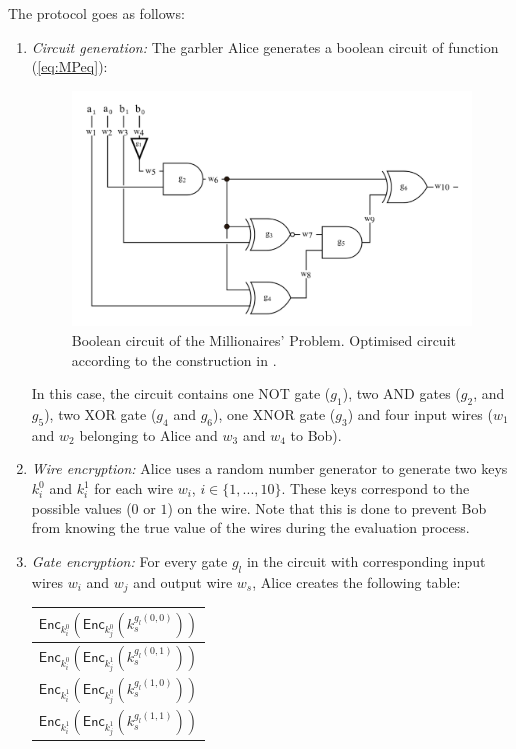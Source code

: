 The protocol goes as follows:
\begin{enumerate}
    \item \textit{Circuit generation:} The garbler Alice generates a boolean circuit of function (\ref{eq:MPeq}):
    
    \begin{figure}[h]
        \centering
        \includegraphics[scale=0.3]{Chapter_TechnicalOverview/booleanCircuit.png}

        \caption{Boolean circuit of the Millionaires' Problem. Optimised circuit according to the construction in \cite{Kolesnikov2009}.}
        \label{fig:boolean}
    \end{figure}
    
    In this case, the circuit contains one NOT gate ($g_1$), two AND gates ($g_2$, and $g_5$), two XOR gate ($g_4$ and $g_6$), one XNOR gate ($g_3$) and four input wires ($w_1$ and $w_2$ belonging to Alice and $w_3$ and $w_4$ to Bob).
    
    \item \textit{Wire encryption:} Alice uses a random number generator to generate two keys $k^0_i$ and $k^1_i$ for each wire $w_i$, $i\in\{1, ..., 10\}$. These keys correspond to the possible values ($0$ or $1$) on the wire. Note that this is done to prevent Bob from knowing the true value of the wires during the evaluation process.
    
    \item \textit{Gate encryption:} For every gate $g_l$ in the circuit with corresponding input wires $w_i$ and $w_j$ and output wire $w_s$, Alice creates the following table:

    \begin{center}
        \begin{tabular}{ |c| } 
        \hline
        $\mathsf{Enc}_{k_i^0}\left(\mathsf{Enc}_{k_j^0}\left(k_s^{g_l(0,0)}\right)\right)$ \\ 
        \hline
        $\mathsf{Enc}_{k_i^0}\left(\mathsf{Enc}_{k_j^1}\left(k_s^{g_l(0,1)}\right)\right)$ \\ 
        \hline
        $\mathsf{Enc}_{k_i^1}\left(\mathsf{Enc}_{k_j^0}\left(k_s^{g_l(1,0)}\right)\right)$ \\ 
        \hline
        $\mathsf{Enc}_{k_i^1}\left(\mathsf{Enc}_{k_j^1}\left(k_s^{g_l(1,1)}\right)\right)$ \\
        \hline
        \end{tabular}
    \end{center}
    

\end{enumerate}
